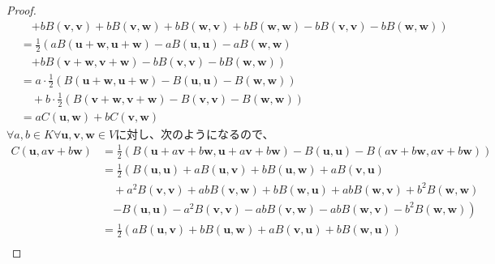 \documentclass[dvipdfmx]{jsarticle}
\begin{document}
\begin{proof}
\begin{align*}
&\quad \left. + bB\left( \mathbf{v},\mathbf{v} \right) + bB\left( \mathbf{v},\mathbf{w} \right) + bB\left( \mathbf{w},\mathbf{v} \right) + bB\left( \mathbf{w},\mathbf{w} \right) - bB\left( \mathbf{v},\mathbf{v} \right) - bB\left( \mathbf{w},\mathbf{w} \right) \right)\\
&= \frac{1}{2}\left( aB\left( \mathbf{u} + \mathbf{w},\mathbf{u} + \mathbf{w} \right) - aB\left( \mathbf{u},\mathbf{u} \right) - aB\left( \mathbf{w},\mathbf{w} \right) \right. \\
&\quad \left. + bB\left( \mathbf{v} + \mathbf{w},\mathbf{v} + \mathbf{w} \right) - bB\left( \mathbf{v},\mathbf{v} \right) - bB\left( \mathbf{w},\mathbf{w} \right) \right)\\
&= a \cdot \frac{1}{2}\left( B\left( \mathbf{u} + \mathbf{w},\mathbf{u} + \mathbf{w} \right) - B\left( \mathbf{u},\mathbf{u} \right) - B\left( \mathbf{w},\mathbf{w} \right) \right) \\
&\quad + b \cdot \frac{1}{2}\left( B\left( \mathbf{v} + \mathbf{w},\mathbf{v} + \mathbf{w} \right) - B\left( \mathbf{v},\mathbf{v} \right) - B\left( \mathbf{w},\mathbf{w} \right) \right)\\
&= aC\left( \mathbf{u},\mathbf{w} \right) + bC\left( \mathbf{v},\mathbf{w} \right)
\end{align*}
$\forall a,b \in K\forall\mathbf{u},\mathbf{v},\mathbf{w} \in V$に対し、次のようになるので、
\begin{align*}
C\left( \mathbf{u},a\mathbf{v} + b\mathbf{w} \right) &= \frac{1}{2}\left( B\left( \mathbf{u} + a\mathbf{v} + b\mathbf{w},\mathbf{u} + a\mathbf{v} + b\mathbf{w} \right) - B\left( \mathbf{u},\mathbf{u} \right) - B\left( a\mathbf{v} + b\mathbf{w},a\mathbf{v} + b\mathbf{w} \right) \right)\\
&= \frac{1}{2}\left( B\left( \mathbf{u},\mathbf{u} \right) + aB\left( \mathbf{u},\mathbf{v} \right) + bB\left( \mathbf{u},\mathbf{w} \right) + aB\left( \mathbf{v},\mathbf{u} \right) \right. \\
&\quad + a^{2}B\left( \mathbf{v},\mathbf{v} \right) + abB\left( \mathbf{v},\mathbf{w} \right) + bB\left( \mathbf{w},\mathbf{u} \right) + abB\left( \mathbf{w},\mathbf{v} \right) + b^{2}B\left( \mathbf{w},\mathbf{w} \right) \\
&\quad \left. - B\left( \mathbf{u},\mathbf{u} \right) - a^{2}B\left( \mathbf{v},\mathbf{v} \right) - abB\left( \mathbf{v},\mathbf{w} \right) - abB\left( \mathbf{w},\mathbf{v} \right) - b^{2}B\left( \mathbf{w},\mathbf{w} \right) \right)\\
&= \frac{1}{2}\left( aB\left( \mathbf{u},\mathbf{v} \right) + bB\left( \mathbf{u},\mathbf{w} \right) + aB\left( \mathbf{v},\mathbf{u} \right) + bB\left( \mathbf{w},\mathbf{u} \right) \right)\\

\end{align*}
\end{proof}
\end{document}
